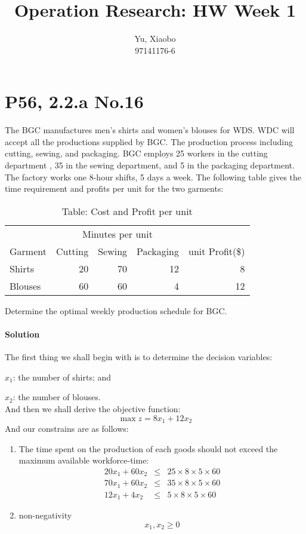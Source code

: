 \documentclass{article}
\title{Operation Research: HW Week 1}
\author{Yu, Xiaobo\\97141176-6}
\numberwithin{equation}{section}
\begin{document}
\maketitle

\section{P56, 2.2.a No.16}
The BGC manufactures men's shirts and women's blouses for WDS. WDC will accept all the productions supplied by BGC. The production process including cutting, sewing, and packaging. BGC employs 25 workers in the cutting department , 35 in the sewing department, and 5 in the packaging department. The factory works one 8-hour shifts, 5 days a week. The following table gives the time requirement and profits per unit for the two garments:
\begin{table}[ht]\caption{Table: Cost and Profit per unit}\label{T1}
\begin{center}
	\begin{tabular}{@{}lrrrr@{}}\toprule
		& \multicolumn{3}{c}{Minutes per unit}\\ \cmidrule{2-4}
		Garment & Cutting & Sewing & Packaging & unit Profit(\$)\\ \midrule
		Shirts & 20 & 70 & 12 & 8\\
		Blouses & 60 & 60 & 4 & 12\\ \bottomrule
	\end{tabular}
\end{center}
\end{table}

Determine the optimal weekly production schedule for BGC.

\paragraph{Solution}

The first thing we shall begin with is to determine the decision variables:

$x_1$: the number of shirts; and

$x_2$: the number of blouses.\\
And then we shall derive the objective function:
\[ \max z=8x_1+12x_2 \]
And our constrains are as follows:
\begin{enumerate}
	\item The time spent on the production of each goods should not exceed the maximum available workforce-time: 
	\begin{eqnarray}
		20x_1+60x_2 &\leqslant& 25 \times 8 \times 5 \times 60 \\
		70x_1+60x_2 &\leqslant& 35 \times 8 \times 5 \times 60 \\
		12x_1+4x_2 &\leqslant& 5 \times 8 \times 5 \times 60 
	\end{eqnarray}
	\item non-negativity
	\begin{equation}
		x_1,x_2 \geqslant 0
	\end{equation}
\end{enumerate}
\end{document}
